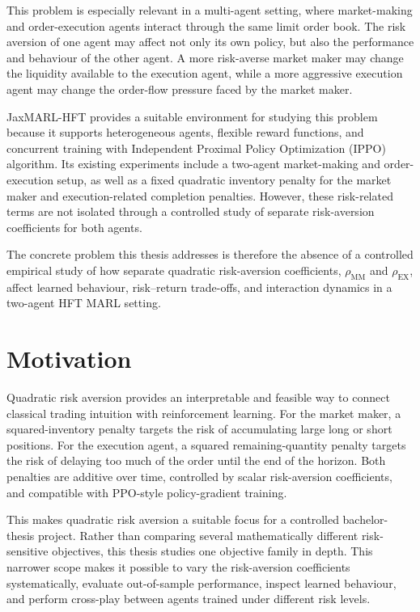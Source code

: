 \documentclass[oneside]{uva-inf-bachelor-thesis}
\begin{document}
This problem is especially relevant in a multi-agent setting, where market-making and order-execution agents interact through the same limit order book. The risk aversion of one agent may affect not only its own policy, but also the performance and behaviour of the other agent. A more risk-averse market maker may change the liquidity available to the execution agent, while a more aggressive execution agent may change the order-flow pressure faced by the market maker.

JaxMARL-HFT provides a suitable environment for studying this problem because it supports heterogeneous agents, flexible reward functions, and concurrent training with Independent Proximal Policy Optimization (IPPO) algorithm. Its existing experiments include a two-agent market-making and order-execution setup, as well as a fixed quadratic inventory penalty for the market maker and execution-related completion penalties. However, these risk-related terms are not isolated through a controlled study of separate risk-aversion coefficients for both agents.

The concrete problem this thesis addresses is therefore the absence of a controlled empirical study of how separate quadratic risk-aversion coefficients, $\rho_{\mathrm{MM}}$ and $\rho_{\mathrm{EX}}$, affect learned behaviour, risk--return trade-offs, and interaction dynamics in a two-agent HFT MARL setting.

\section{Motivation}

Quadratic risk aversion provides an interpretable and feasible way to connect classical trading intuition with reinforcement learning. For the market maker, a squared-inventory penalty targets the risk of accumulating large long or short positions. For the execution agent, a squared remaining-quantity penalty targets the risk of delaying too much of the order until the end of the horizon. Both penalties are additive over time, controlled by scalar risk-aversion coefficients, and compatible with PPO-style policy-gradient training.

This makes quadratic risk aversion a suitable focus for a controlled bachelor-thesis project. Rather than comparing several mathematically different risk-sensitive objectives, this thesis studies one objective family in depth. This narrower scope makes it possible to vary the risk-aversion coefficients systematically, evaluate out-of-sample performance, inspect learned behaviour, and perform cross-play between agents trained under different risk levels.
\end{document}
